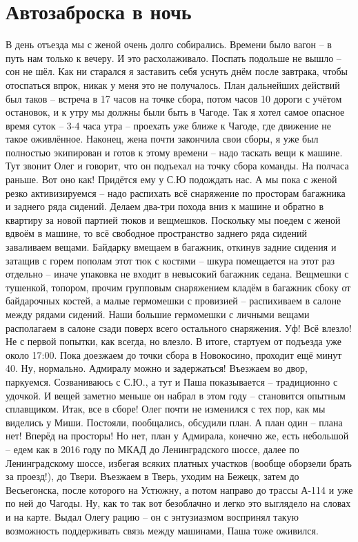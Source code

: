 \chapter{Автозаброска в ночь} 

В день отъезда мы с женой очень долго собирались. Времени было вагон – в путь нам только к вечеру. И это расхолаживало. Поспать подольше не вышло – сон не шёл. Как ни старался я заставить себя уснуть днём после завтрака, чтобы отоспаться впрок, никак у меня это не получалось. План дальнейших действий был таков – встреча в 17 часов на точке сбора, потом часов 10 дороги с учётом остановок, и к утру мы должны были быть в Чагоде. Так я хотел самое опасное время суток – 3-4 часа утра – проехать уже ближе к Чагоде, где движение не такое оживлённое. 
Наконец, жена почти закончила свои сборы, я уже был полностью экипирован и готов к этому времени – надо таскать вещи к машине. Тут звонит Олег и говорит, что он подъехал на точку сбора команды. На полчаса раньше. Вот оно как! Придётся ему у С.Ю подождать нас. А мы пока с женой резко активизируемся – надо распихать всё снаряжение по просторам багажника и заднего ряда сидений. Делаем два-три похода вниз к машине и обратно в квартиру за новой партией тюков и вещмешков. Поскольку мы поедем с женой вдвоём в машине, то всё свободное пространство заднего ряда сидений заваливаем вещами. Байдарку вмещаем в багажник, откинув задние сидения и затащив с горем пополам этот тюк с костями – шкура помещается на этот раз отдельно – иначе упаковка не входит в невысокий багажник седана. Вещмешки с тушенкой, топором, прочим групповым снаряжением кладём в багажник сбоку от байдарочных костей, а малые гермомешки с провизией – распихиваем в салоне между рядами сидений. Наши большие гермомешки с личными вещами располагаем в салоне сзади поверх всего остального снаряжения. Уф! Всё влезло! Не с первой попытки, как всегда, но влезло. 
В итоге, стартуем от подъезда уже около 17:00. Пока доезжаем до точки сбора в Новокосино, проходит ещё минут 40. Ну, нормально. Адмиралу можно и задержаться! Въезжаем во двор, паркуемся. Созваниваюсь с С.Ю., а тут и Паша показывается – традиционно с удочкой. И вещей заметно меньше он набрал в этом году – становится опытным сплавщиком. Итак, все в сборе! Олег почти не изменился с тех пор, как мы виделись у Миши. Постояли, пообщались, обсудили план. А план один – плана нет! Вперёд на просторы! 
Но нет, план у Адмирала, конечно же, есть небольшой – едем как в 2016 году по МКАД до Ленинградского шоссе, далее по Ленинградскому шоссе, избегая всяких платных участков (вообще оборзели брать за проезд!), до Твери. Въезжаем в Тверь, уходим на Бежецк, затем до Весьегонска, после которого на Устюжну, а потом направо до трассы А-114 и уже по ней до Чагоды. Ну, как то так вот безоблачно и легко это выглядело на словах и на карте. Выдал Олегу рацию – он с энтузиазмом воспринял такую возможность поддерживать связь между машинами, Паша тоже оживился. 
